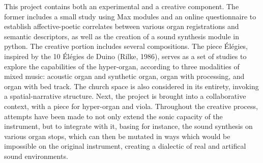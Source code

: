 \documentclass[12pt,twoside,maitrise]{dms}
\theoremstyle{definition}
\numberwithin{equation}{section}
\numberwithin{table}{chapter}
\numberwithin{figure}{chapter}
\begin{document}
This project contains both an experimental and a creative component. 
The former includes a small study using Max modules and an online questionnaire to establish affective-poetic correlates between various organ registrations and semantic descriptors, as well as the creation of a sound synthesis module in python. 
The creative portion includes several compositions. 
The piece Élégies, inspired by the 10 Élégies de Duino (Rilke, 1986), serves as a set of studies to explore the capabilities of the hyper-organ, according to three modalities of mixed music: acoustic organ and synthetic organ, organ with processing, and organ with bed track. 
The church space is also considered in its entirety, invoking a spatial-narrative structure. 
Next, the project is brought into a collaborative context, with a piece for hyper-organ and viola. 
Throughout the creative process, attempts have been made to not only extend the sonic capacity of the instrument, but to integrate with it, basing for instance, the sound synthesis on various organ stops, which can then be mutated in ways which would be impossible on the original instrument, creating a dialectic of real and artifical sound environments.


\end{document}
